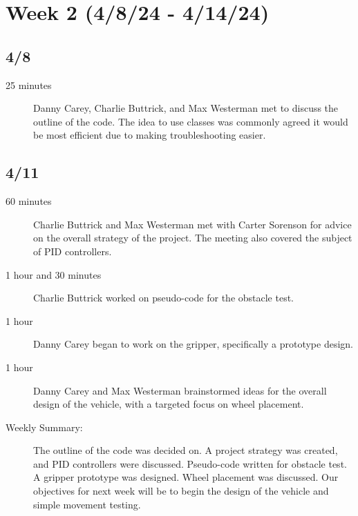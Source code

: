 \documentclass[11pt]{report}
\begin{document}
\section{Week 2 (4/8/24 - 4/14/24)}
\begin{adjustwidth}{0.5cm}{0cm}
\subsection*{4/8}
\begin{greylineformat}
\begin{description}
    \item [25 minutes]Danny Carey, Charlie Buttrick, and Max Westerman met to discuss the outline of the code. The idea to use classes was commonly agreed it would be most efficient due to making troubleshooting easier.
\end{description}\end{greylineformat}

\vspace{-2.1em}\subsection*{4/11}
\begin{greylineformat}
\begin{description}
    \item [60 minutes]Charlie Buttrick and Max Westerman met with Carter Sorenson for advice on the overall strategy of the project. The meeting also covered the subject of \gls{PID} controllers.
    \item [1 hour and 30 minutes]Charlie Buttrick worked on pseudo-code for the obstacle test.
    \item [1 hour]Danny Carey began to work on the gripper, specifically a prototype design.
    \item [1 hour] Danny Carey and Max Westerman brainstormed ideas for the overall design of the vehicle, with a targeted focus on wheel placement.
\end{description}\end{greylineformat}

\begin{description}
    \item [Weekly Summary:]The outline of the code was decided on. A project strategy was created, and \gls{PID} controllers were discussed. Pseudo-code written for obstacle test. A gripper prototype was designed. Wheel placement was discussed. Our objectives for next week will be to begin the design of the vehicle and simple movement testing.
\end{description}
\end{adjustwidth}\vspace{0.5em}
\end{document}
